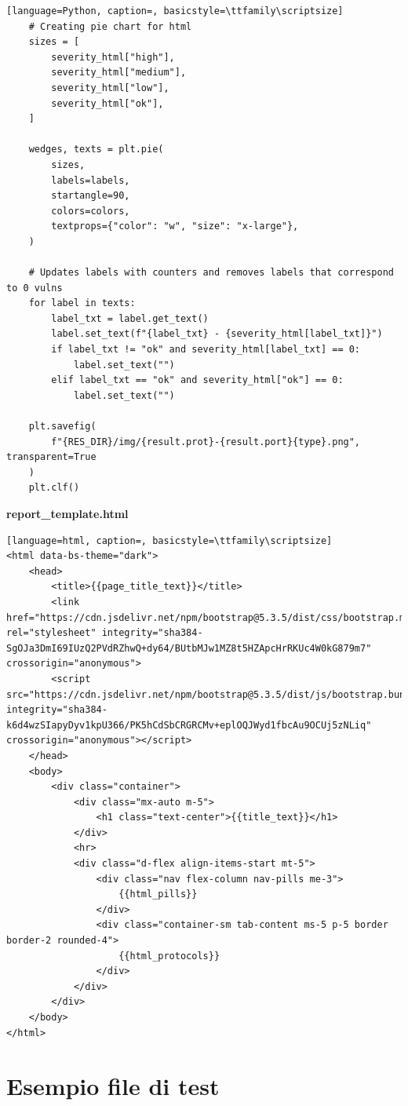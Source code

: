 \documentclass[12pt]{report}
\begin{document}
\begin{lstlisting}[language=Python, caption=, basicstyle=\ttfamily\scriptsize]
    # Creating pie chart for html
    sizes = [
        severity_html["high"],
        severity_html["medium"],
        severity_html["low"],
        severity_html["ok"],
    ]

    wedges, texts = plt.pie(
        sizes,
        labels=labels,
        startangle=90,
        colors=colors,
        textprops={"color": "w", "size": "x-large"},
    )

    # Updates labels with counters and removes labels that correspond to 0 vulns
    for label in texts:
        label_txt = label.get_text()
        label.set_text(f"{label_txt} - {severity_html[label_txt]}")
        if label_txt != "ok" and severity_html[label_txt] == 0:
            label.set_text("")
        elif label_txt == "ok" and severity_html["ok"] == 0:
            label.set_text("")

    plt.savefig(
        f"{RES_DIR}/img/{result.prot}-{result.port}{type}.png", transparent=True
    )
    plt.clf()
\end{lstlisting}

\noindent
\textbf{report\_template.html}
\begin{lstlisting}[language=html, caption=, basicstyle=\ttfamily\scriptsize]
<html data-bs-theme="dark">
    <head>
        <title>{{page_title_text}}</title>
        <link href="https://cdn.jsdelivr.net/npm/bootstrap@5.3.5/dist/css/bootstrap.min.css" rel="stylesheet" integrity="sha384-SgOJa3DmI69IUzQ2PVdRZhwQ+dy64/BUtbMJw1MZ8t5HZApcHrRKUc4W0kG879m7" crossorigin="anonymous">
        <script src="https://cdn.jsdelivr.net/npm/bootstrap@5.3.5/dist/js/bootstrap.bundle.min.js" integrity="sha384-k6d4wzSIapyDyv1kpU366/PK5hCdSbCRGRCMv+eplOQJWyd1fbcAu9OCUj5zNLiq" crossorigin="anonymous"></script>
    </head>
    <body>
        <div class="container">
            <div class="mx-auto m-5">
                <h1 class="text-center">{{title_text}}</h1>
            </div>
            <hr>
            <div class="d-flex align-items-start mt-5">
                <div class="nav flex-column nav-pills me-3">
                    {{html_pills}}
                </div>
                <div class="container-sm tab-content ms-5 p-5 border border-2 rounded-4">
                    {{html_protocols}}
                </div>
            </div>
        </div>
    </body>
</html>
\end{lstlisting}

% 
% 

\chapter{Esempio file di test}
\label{cap:file_test}
\end{document}
